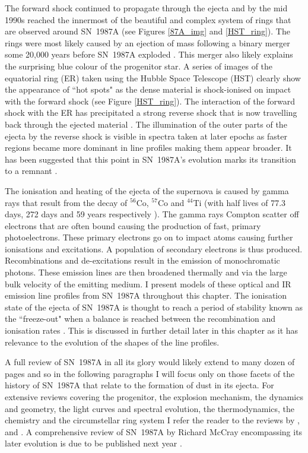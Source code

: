 The forward shock continued to propagate through the ejecta and by the mid 1990s reached the innermost of the beautiful and complex system of rings that are observed around SN~1987A (see Figures \ref{87A_img} and \ref{HST_ring}).  The rings were most likely caused by an ejection of mass following a binary merger some 20,000 years before SN~1987A exploded \citep{Morris2005,Fitzpatrick2013}.  This merger also likely explains the surprising blue colour of the progenitor star.  A series of images of the equatorial ring (ER) taken using the Hubble Space Telescope (HST)  clearly show the appearance of ``hot spots" as the dense material is shock-ionised on impact with the forward shock (see Figure \ref{HST_ring}).  The interaction of the forward shock with the ER has precipitated a strong reverse shock that is now travelling back through the ejected material \citep{Fransson2013}.  The illumination of the outer parts of the ejecta by the reverse shock is visible in spectra taken at later epochs as faster regions became more dominant in line profiles making them appear broader.  It has been suggested that this point in SN~1987A's evolution marks its transition to a remnant \citep{McCray2003}.

The ionisation and heating of the ejecta of the supernova is caused by gamma rays that result from the decay of $^{56}$Co, $^{57}$Co and $^{44}$Ti (with half lives of 77.3 days, 272 days and 59 years respectively \citep{Manuel2002}).  The gamma rays Compton scatter off electrons that are often bound causing the production of fast, primary photoelectrons. These primary electrons go on to impact atoms causing further ionisations and excitations. A population of secondary electrons is thus produced.  Recombinations and de-excitations result in the emission of monochromatic photons.  These emission lines are then broadened thermally and via the large bulk velocity of the emitting medium.  I present models of these optical and IR emission line profiles from SN~1987A throughout this chapter.  The ionisation state of the ejecta of SN~1987A is thought to reach a period of stability known as the ``freeze-out" when a balance is reached between the recombination and ionisation rates \citep{Danziger1991,Kozma1998a,Fransson2013}.  This is discussed in further detail later in this chapter as it has relevance to the evolution of the shapes of the line profiles.

A full review of SN~1987A in all its glory would likely extend to many dozen of pages and so in the following paragraphs I will focus only on those facets of the history of SN~1987A that relate to the formation of dust in its ejecta.  For extensive reviews covering the progenitor, the explosion mechanism, the dynamics and geometry, the light curves and spectral evolution, the thermodynamics, the chemistry and the circumstellar ring system I refer the reader to the reviews by \citet{Arnett1989}, \citet{McCray1993} and \citet{McCray2003}.  A comprehensive review of SN~1987A by Richard McCray encompassing its later evolution is due to be published next year \citep{McCray2016}.



